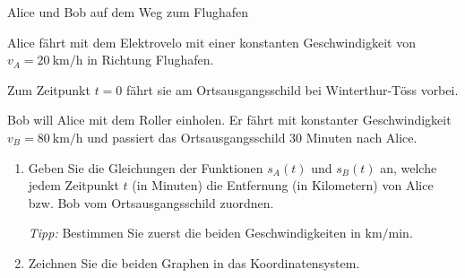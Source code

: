 \clearpage
\begin{ueb}{Alice und Bob auf dem Weg zum Flughafen}{}

    Alice fährt mit dem Elektrovelo mit einer konstanten Geschwindigkeit
    von \(v_A=\SI{20}{\kilo\meter\per\hour}\) in Richtung Flughafen.

    Zum Zeitpunkt \(t=0\) fährt sie am Ortsausgangsschild bei
    Winterthur-Töss vorbei.

    Bob will Alice mit dem Roller einholen. Er fährt mit konstanter
    Geschwindigkeit \(v_B=\SI{80}{\kilo\meter\per\hour}\) und passiert
    das Ortsausgangsschild 30 Minuten nach Alice.

    \begin{enumerate}
        \item Geben Sie die Gleichungen der Funktionen \(s_A(t)\)
              und \(s_B(t)\) an, welche jedem Zeitpunkt \(t\)
              (in Minuten) die Entfernung (in Kilometern) von Alice
              bzw. Bob vom Ortsausgangsschild zuordnen.

              \emph{Tipp:} Bestimmen Sie zuerst die beiden
              Geschwindigkeiten in \(\si{\kilo\meter\per\minute}\).


        \item Zeichnen Sie die beiden Graphen in das Koordinatensystem.

              \begin{center}
\end{center}
\end{enumerate}
\end{ueb}
